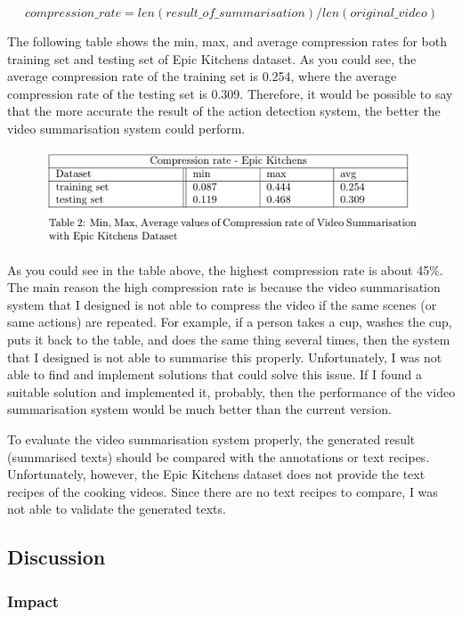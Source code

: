 \documentclass{article}
\begin{document}
\[compression\_rate = len(result\_of\_summarisation) / len(original\_video)\]

The following table shows the min, max, and average compression rates for both training set and testing set of Epic Kitchens dataset. As you could see, the average compression rate of the training set is 0.254, where the average compression rate of the testing set is 0.309. Therefore, it would be possible to say that the more accurate the result of the action detection system, the better the video summarisation system could perform.

\begin{figure}[H]
    \centering
    \includegraphics[scale=0.7]{imgs/compression_rate.png}
    \label{fig:compression_rate_table_EpicKitchens}
\end{figure}

As you could see in the table above, the highest compression rate is about 45\%. The main reason the high compression rate is because the video summarisation system that I designed is not able to compress the video if the same scenes (or same actions) are repeated. For example, if a person takes a cup, washes the cup, puts it back to the table, and does the same thing several times, then the system that I designed is not able to summarise this properly. Unfortunately, I was not able to find and implement solutions that could solve this issue. If I found a suitable solution and implemented it, probably, then the performance of the video summarisation system would be much better than the current version.

To evaluate the video summarisation system properly, the generated result (summarised texts) should be compared with the annotations or text recipes. Unfortunately, however, the Epic Kitchens dataset does not provide the text recipes of the cooking videos. Since there are no text recipes to compare, I was not able to validate the generated texts.


\subsection{Discussion}

\subsubsection{Impact}
\end{document}

